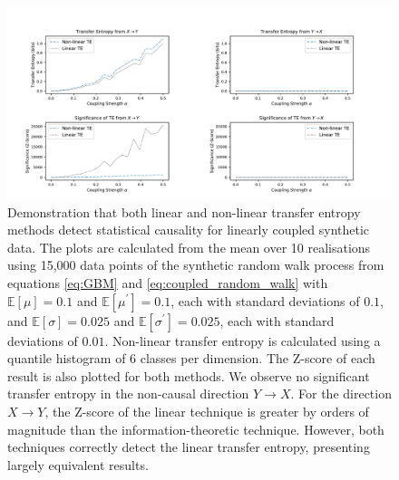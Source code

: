 \documentclass[]{rsos}%
\begin{document}
  \begin{figure}[!htb]
    \includegraphics[width=\linewidth]{images/confirming_gbm.pdf}
    \caption{Demonstration that both linear and non-linear transfer entropy methods detect {\color{blue}statistical} causality for linearly coupled synthetic data. The plots are calculated from the mean over 10 realisations using 15,000 data points of the synthetic random walk process from equations \ref{eq:GBM} and \ref{eq:coupled_random_walk} with $\mathbb{E} [\mu]=0.1$ and $\mathbb{E} [\mu^{\prime}]=0.1$, each with standard deviations of $0.1$, and $\mathbb{E} [\sigma]=0.025$ and $\mathbb{E} [\sigma^{\prime}]=0.025$, each with standard deviations of $0.01$.
    Non-linear transfer entropy is calculated using a quantile histogram of 6 classes per dimension. The Z-score of each result is also plotted for both methods. We observe no significant transfer entropy in the non-causal direction $Y \rightarrow X$. For the direction $X \rightarrow Y$, the Z-score of the linear technique is greater by orders of magnitude than the information-theoretic technique. However, both techniques correctly detect the linear transfer entropy, presenting largely equivalent results.}
    \label{fig:GBM_confirmation}


\end{figure}
\end{document}
